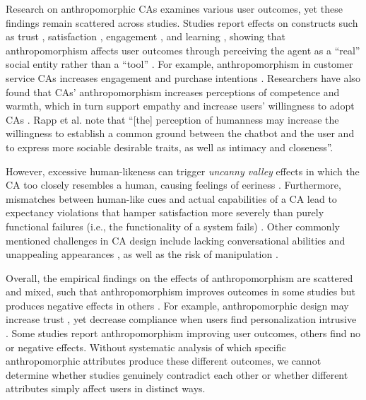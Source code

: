 \documentclass[sigconf,review,anonymous]{acmart}
\begin{document}
Research on anthropomorphic CAs examines various user outcomes, yet these findings remain scattered across studies. Studies report effects on constructs such as trust \citep{nordheim2019trust}, satisfaction \citep{haugeland_understanding_2022}, engagement \citep{mehra_chatbot_2021}, and learning \citep{zheldibayeva_genai_2025}, showing that %
anthropomorphism affects user outcomes %
through perceiving the agent as a ``real'' social entity rather than a ``tool'' \citep{meyer2023leverage,wang2021seeing}. For example, anthropomorphism in customer service CAs increases engagement and purchase intentions \citep{depaula2025anthropomorphism,luo2019frontiers}. Researchers have also found that CAs' anthropomorphism increases perceptions of competence and warmth, which in turn support empathy and increase users' willingness to adopt CAs \citep{kim_what_2024}. Rapp et al. \cite{rapp_human_2021} note that ``[the] perception of humanness may increase the willingness to establish a common ground between the chatbot and the user and to express more sociable desirable traits, as well as intimacy and closeness''.

However, excessive human-likeness can trigger \textit{uncanny valley} effects in which the CA too closely resembles a human, causing feelings of eeriness \citep{mori_bukimi_1970,soni2024chatbot}. Furthermore, mismatches between human-like cues and actual capabilities of a CA lead to expectancy violations that hamper satisfaction more severely than purely functional failures (i.e., the functionality of a system fails) \citep{ischen2024communication,qu2024chatbot}. Other commonly mentioned challenges in CA design include lacking conversational abilities and unappealing appearances \citep{diederich_design_2022}, as well as the risk of manipulation \citep{chaves2021should}.

Overall, the empirical findings on the effects of anthropomorphism are scattered and mixed, such that anthropomorphism improves outcomes in some studies \citep{go2019humanizing} but produces negative effects in others \citep{crolic2022blame}. For example, anthropomorphic design may increase trust \citep{go2019humanizing,konya2023anthropomorphism}, yet decrease compliance when users find personalization intrusive \citep{chen_you_2021}. Some studies report anthropomorphism improving user outcomes, others find no or negative effects. Without systematic analysis of which specific anthropomorphic attributes produce these different outcomes, we cannot determine whether studies genuinely contradict each other or whether different attributes simply affect users in distinct ways.
\end{document}

